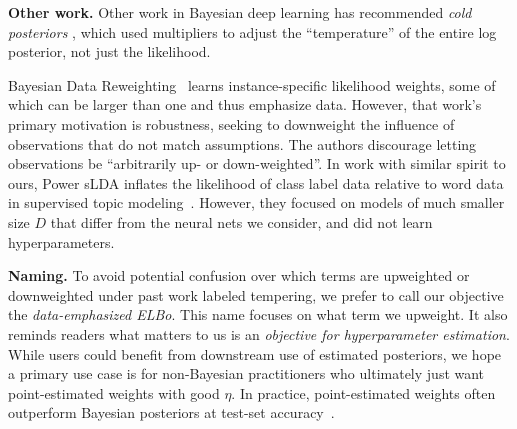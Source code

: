 \textbf{Other work.}
Other work in Bayesian deep learning has recommended \emph{cold posteriors} \citep{wenzel2020good, kapoor2022uncertainty}, which used multipliers to adjust the ``temperature'' of the entire log posterior, not just the likelihood.

Bayesian Data Reweighting~\citep{wang2017robust} learns instance-specific likelihood weights, some of which can be larger than one and thus emphasize data. However, that work's primary motivation is robustness, seeking to downweight the influence of observations that do not match assumptions. The authors discourage letting observations be ``arbitrarily up- or down-weighted''. In work with similar spirit to ours, Power sLDA inflates the likelihood of class label data relative to word data in supervised topic modeling~\citep{zhang2015supervise}. However, they 
focused on models of much smaller size $D$ that differ from the neural nets we consider, and did not learn hyperparameters.

\textbf{Naming.}
To avoid potential confusion over which terms are upweighted or downweighted under past work labeled tempering, we prefer to call our objective the \emph{data-emphasized ELBo}. This name focuses on what term we upweight. It also reminds readers what matters to us is an \emph{objective for hyperparameter estimation}. While users could benefit from downstream use of estimated posteriors, we hope a primary use case is for non-Bayesian practitioners who ultimately just want point-estimated weights with good $\eta$. In practice, point-estimated weights often outperform Bayesian posteriors at test-set accuracy~\citep{pitas2024fine}.

